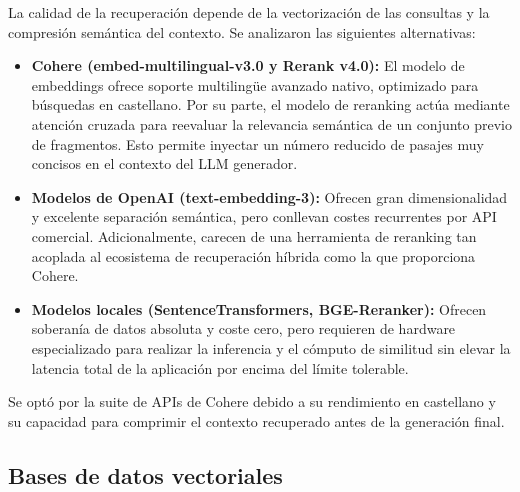 \documentclass[12pt,a4paper,oneside]{report}
\begin{document}
La calidad de la recuperación depende de la vectorización de las consultas y la compresión semántica del contexto. Se analizaron las siguientes alternativas:
\begin{itemize}
    \item \textbf{Cohere (embed-multilingual-v3.0 y Rerank v4.0):} El modelo de embeddings ofrece soporte multilingüe avanzado nativo, optimizado para búsquedas en castellano. Por su parte, el modelo de reranking actúa mediante atención cruzada para reevaluar la relevancia semántica de un conjunto previo de fragmentos. Esto permite inyectar un número reducido de pasajes muy concisos en el contexto del LLM generador.
    \item \textbf{Modelos de OpenAI (text-embedding-3):} Ofrecen gran dimensionalidad y excelente separación semántica, pero conllevan costes recurrentes por API comercial. Adicionalmente, carecen de una herramienta de reranking tan acoplada al ecosistema de recuperación híbrida como la que proporciona Cohere.
    \item \textbf{Modelos locales (SentenceTransformers, BGE-Reranker):} Ofrecen soberanía de datos absoluta y coste cero, pero requieren de hardware especializado para realizar la inferencia y el cómputo de similitud sin elevar la latencia total de la aplicación por encima del límite tolerable.
\end{itemize}

Se optó por la suite de APIs de Cohere debido a su rendimiento en castellano y su capacidad para comprimir el contexto recuperado antes de la generación final.

\subsection*{Bases de datos vectoriales}
\end{document}
